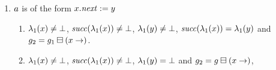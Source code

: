{\begin{enumerate}
\begin{enumerate}
\begin{enumerate}
    $\graph_2=\graph_1\delVar{\xvar}$.
  \item \label{pre:case:assignedDotNextB}%
    $\labeling_1(\xvar)\neq\undef$, %
    $\labeling_1(\yvar)\neq\undef$, %
    $\labeling_1(\yvar)\neq\labeling_1(\nil)$, %
    $\suc(\labeling_1(\yvar))=\undef$ and
    $\graph_2=\graph\delVar{\xvar}$, where
    $\graph=\graph_1\addEdgeBetween{\yvar}{\xvar}$.
  \item \label{pre:case:assignedDotNextC}%
    $\labeling_1(\xvar)\neq\undef$, %
    $\labeling_1(\yvar)=\undef$ %
    and there are graphs $\graph,\graph'$ such that
    $\graph_2=\graph'\delVar{\xvar}$, %
    $\graph'=\graph\addEdgeBetween{\yvar}{\xvar}$ and %
    $\graph=\graph_1\addVarAsPredOf{\xvar}{\yvar}$.
  \item \label{pre:case:assignedDotNextD}%
    $\labeling_1(\xvar)=\undef$, %
    $\labeling_1(\yvar)\neq\undef$, %
    $\suc(\labeling_1(\yvar))\neq\undef$ and %
    $\graph_2=\graph_1$.
  \item \label{pre:case:assignedDotNextE}%
    $\labeling_1(\xvar)=\undef$, %
    $\labeling_1(\yvar)\neq\undef$, %
    $\labeling_1(\yvar)\neq\labeling_1(\nil)$, %
    $\suc(\labeling_1(\yvar))=\undef$ and %
    $\graph_2=\graph_1\addEdge{\yvar}$.
  \item \label{pre:case:assignedDotNextF}%
    $\labeling_1(\xvar)=\undef$, %
    $\labeling_1(\yvar)=\undef$ %
    there are graphs $\graph,\graph',\graph_3$ such that
    $\graph\equals\graph_1\addVar{\xvar}$, %
    $\graph'\in\graph\addVarAsPredOf{\xvar}{\yvar}$, %
    $\graph_3\equals\graph'\addEdgeBetween{\yvar}{\xvar}$ and %
    $\graph_2=\graph_3\delVar{\xvar}$.
    Observe that \xvar\ just serves here as a temporary variable.
  \end{enumerate}
\item $a$ is of the form $x.{\it next}:=y$
  \begin{enumerate}
  \item \label{pre:case:dotNextAssignedA}%
    $\labeling_1(\xvar)\neq\undef$, %
    ${\it succ}(\lambda_1(x))\neq\bot$, %
    $\labeling_1(\yvar)\neq\undef$, %
    ${\it succ}(\lambda_1(x))=\lambda_1(y)$ and
    $g_2=g_1\boxminus({x}\rightarrow)$.
  \item \label{pre:case:dotNextAssignedB}%
    $\labeling_1(\xvar)\neq\undef$, %
    ${\it succ}(\lambda_1(x))\neq\bot$, %
    $\labeling_1(\yvar)=\undef$ and %
    $g_2=g\boxminus({x}\rightarrow)$, %

\end{enumerate}
\end{enumerate}
\end{enumerate}}
